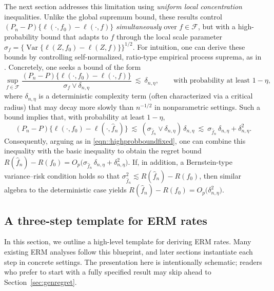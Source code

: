 \documentclass[11pt]{article}
\theoremstyle{plain}
\theoremstyle{definition} %
\newcommand{\Var}{\operatorname{Var}}
\begin{document}
The next section addresses this limitation using \emph{uniform local concentration} inequalities.
Unlike the global supremum bound, these results control
\((P_n-P)\{\ell(\cdot,f_0)-\ell(\cdot,f)\}\) \emph{simultaneously} over \(f\in\mathcal F\), but with a
high-probability bound that adapts to \(f\) through the local scale parameter \(\sigma_f = \{\Var\{\ell(Z,f_0)-\ell(Z,f)\}\}^{1/2}\).
For intuition, one can derive these bounds by controlling self-normalized, ratio-type empirical process
suprema, as in \citet{gine2006concentration}.
Concretely, one seeks a bound of the form
\[
\sup_{f\in\mathcal F}\frac{(P_n-P)\{\ell(\cdot,f_0)-\ell(\cdot,f)\}}{\sigma_f \vee \delta_{n,\eta}}
\ \lesssim\ \delta_{n,\eta},
\qquad\text{with probability at least }1-\eta,
\]
where \(\delta_{n,\eta}\) is a deterministic complexity term (often characterized via a critical
radius) that may decay more slowly than \(n^{-1/2}\) in nonparametric settings.
Such a bound implies that, with probability at least \(1-\eta\),
\begin{equation}
    (P_n-P)\{\ell(\cdot,f_0)-\ell(\cdot,\hat f_n)\}
\ \lesssim\ (\sigma_{\hat f_n} \vee \delta_{n,\eta})\,\delta_{n,\eta}
\ \lesssim\ \sigma_{\hat f_n}\,\delta_{n,\eta} + \delta_{n,\eta}^2. \label{example::rateineq}
\end{equation}
Consequently, arguing as in \eqref{eqn::highprobboundfixed}, one can combine this inequality with the basic inequality to obtain the regret bound
\(R(\hat f_n)-R(f_0)=O_p\bigl(\sigma_{\hat f_n}\,\delta_{n,\eta} + \delta_{n,\eta}^2\bigr)\).
If, in addition, a Bernstein-type variance--risk condition holds so that
\(\sigma_{\hat f_n}^2 \lesssim R(\hat f_n)-R(f_0)\),
then similar algebra to the deterministic case yields
\(R(\hat f_n)-R(f_0)=O_p\bigl(\delta_{n,\eta}^2\bigr)\).






\subsection{A three-step template for ERM rates}
\label{sec:template}

In this section, we outline a high-level template for deriving ERM rates. Many
existing ERM analyses follow this blueprint, and later sections instantiate
each step in concrete settings. The presentation here is intentionally
schematic; readers who prefer to start with a fully specified result may skip
ahead to Section~\ref{sec:genregret}.
 
\end{document}
